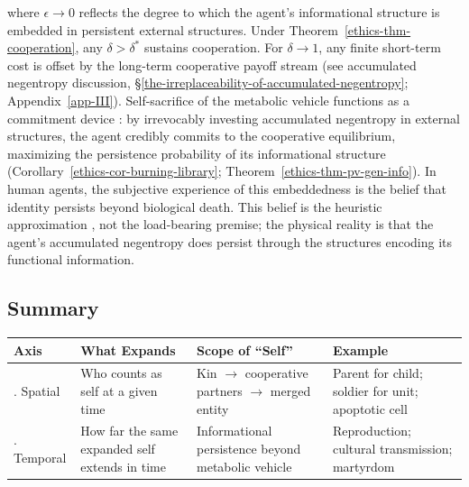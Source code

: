 \documentclass[11pt]{article}
\theoremstyle{plain}
\theoremstyle{definition}
\theoremstyle{remark}
\newcounter{none}
\let\origsubsection\subsection
\renewcommand{\subsection}{\needspace{7\baselineskip}\origsubsection}
\begin{document}
where \(\epsilon \to 0\) reflects the degree to which the agent's
informational structure is embedded in persistent external structures.
Under Theorem~\ref{ethics-thm-cooperation}, any \(\delta > \delta^*\)
sustains cooperation. For \(\delta \to 1\), any finite short-term cost
is offset by the long-term cooperative payoff stream (see accumulated
negentropy discussion,
§\ref{the-irreplaceability-of-accumulated-negentropy};
Appendix~\ref{app-III}). Self-sacrifice of the metabolic vehicle
functions as a commitment device \citep{Frank1988}: by irrevocably
investing accumulated negentropy in external structures, the agent
credibly commits to the cooperative equilibrium, maximizing the
persistence probability of its informational structure
(Corollary~\ref{ethics-cor-burning-library};
Theorem~\ref{ethics-thm-pv-gen-info}). In human agents, the subjective
experience of this embeddedness is the belief that identity persists
beyond biological death. This belief is the heuristic approximation
\citep{Haidt2001, Gigerenzer2010}, not the load-bearing premise; the
physical reality is that the agent's accumulated negentropy does persist
through the structures encoding its functional information.

\subsection{Summary}\label{summary}

{\def\LTcaptype{none} %
\begin{longtable}[]{@{}
  >{\raggedright\arraybackslash}p{}
  >{\raggedright\arraybackslash}p{}
  >{\raggedright\arraybackslash}p{}
  >{\raggedright\arraybackslash}p{}@{}}
\toprule\noalign{}
\begin{minipage}[b]{\linewidth}\raggedright
Axis
\end{minipage} & \begin{minipage}[b]{\linewidth}\raggedright
What Expands
\end{minipage} & \begin{minipage}[b]{\linewidth}\raggedright
Scope of ``Self''
\end{minipage} & \begin{minipage}[b]{\linewidth}\raggedright
Example
\end{minipage} \\
\midrule\noalign{}
\endhead
\bottomrule\noalign{}
\endlastfoot
1. Spatial & Who counts as self at a given time & Kin \(\to\)
cooperative partners \(\to\) merged entity & Parent for child; soldier
for unit; apoptotic cell \\
2. Temporal & How far the same expanded self extends in time &
Informational persistence beyond metabolic vehicle & Reproduction;
cultural transmission; martyrdom \\
\end{longtable}
}
\end{document}
